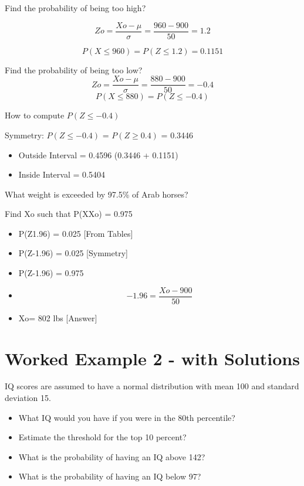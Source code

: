 Find the probability of being too high?

\[Zo=\frac{Xo-\mu}{\sigma}= \frac{960 -900}{50}= 1.2\]

\[P(X \leq 960) = P(Z \leq 1.2) = 0.1151\]


Find the probability of being too low?
\[Zo= \frac{Xo-\mu}{\sigma}= \frac{880 -900}{50}= -0.4 \]
\[P(X \leq 880) = P(Z \leq -0.4)  \]

How to compute $P(Z \leq -0.4)$

Symmetry: 	$P(Z \leq -0.4)$ = $P(Z \geq 0.4)$ = 0.3446


\begin{itemize}
	\item Outside Interval = 0.4596        (0.3446 +  0.1151)
	\item Inside Interval = 0.5404
\end{itemize}



What weight is exceeded by 97.5\% of Arab horses?

Find Xo  such that P(XXo) = 0.975

\begin{itemize}
	\item 	P(Z1.96) = 0.025     [From Tables] 
	
	\item	P(Z-1.96) = 0.025  [Symmetry]
	
	\item	P(Z-1.96) = 0.975         
	
	\item	\[-1.96 = \frac{Xo- 900}{50} \]
	
	
	\item	Xo= 802 lbs  [Answer]
\end{itemize}	








\section{Worked Example 2 - with Solutions}
IQ scores are assumed to have a normal distribution with mean 100 and standard deviation 15.

\begin{itemize}
	\item What IQ would you have if you were in the 80th percentile?
	\item Estimate the threshold for the top 10 percent?
	\item What is the probability of having an IQ above 142?
	\item What is the probability of having an IQ below 97?
\end{itemize}

